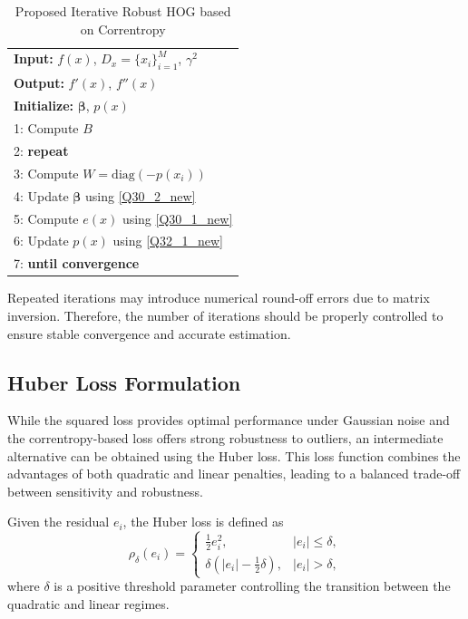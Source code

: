 \documentclass{elsarticle}
\begin{document}
\begin{table}[t]
	\centering
	\normalsize
	\caption{Proposed Iterative Robust HOG based on Correntropy}
	\label{tab:robust_hog}
	\begin{tabular}{l}
		\hline
		\textbf{Input:} $f(x)$, $D_x = \{x_i\}_{i=1}^M$, $\gamma^2$ \\ 
		\textbf{Output:} $f'(x)$, $f''(x)$ \\
		
		\textbf{Initialize:} $\boldsymbol{\beta}$, $p(x)$ \\
		
		1: Compute $B$ \\
		2: \textbf{repeat} \\
		3: \quad Compute $W = \mathrm{diag}(-p(x_i))$ \\
		4: \quad Update $\boldsymbol{\beta}$ using \eqref{Q30_2_new} \\
		5: \quad Compute $e(x)$ using \eqref{Q30_1_new} \\
		6: \quad Update $p(x)$ using \eqref{Q32_1_new} \\
		7: \textbf{until convergence} \\
		\hline
	\end{tabular}
\end{table}

Repeated iterations may introduce numerical round-off errors due to matrix inversion. Therefore, the number of iterations should be properly controlled to ensure stable convergence and accurate estimation.


\subsection{Huber Loss Formulation}

While the squared loss provides optimal performance under Gaussian noise and the correntropy-based loss offers strong robustness to outliers, an intermediate alternative can be obtained using the Huber loss. This loss function combines the advantages of both quadratic and linear penalties, leading to a balanced trade-off between sensitivity and robustness.

Given the residual $e_i$, the Huber loss is defined as
\begin{equation}
	\rho_{\delta}(e_i) =
	\begin{cases}
		\frac{1}{2} e_i^2, & |e_i| \leq \delta, \\
		\delta \left( |e_i| - \frac{1}{2} \delta \right), & |e_i| > \delta,
	\end{cases}
\end{equation}
where $\delta$ is a positive threshold parameter controlling the transition between the quadratic and linear regimes.
\end{document}
